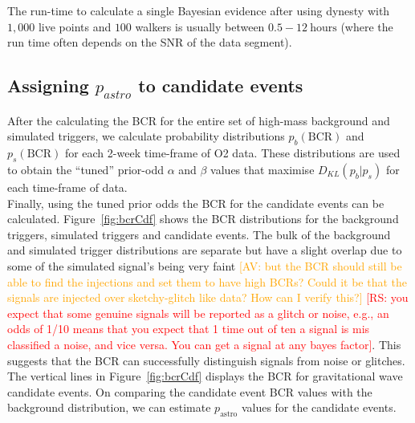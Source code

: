 \documentclass[%
preprint,
 amsmath,amssymb,
 aps,
]{revtex4}
\newcommand{\dynesty}{{\sc dynesty}\xspace}
\newcommand{\bcr}{{\sc BCR}\xspace}
\newcommand{\av}[1]{\textcolor{orange}{[AV: #1]}}
\newcommand{\rs}[1]{\textcolor{red}{[RS: #1]}}
\begin{document}
The run-time to calculate a single Bayesian evidence after using \dynesty with $1,000$ live points and $100$ walkers is usually between $0.5-12\ \text{hours}$ (where the run time often depends on the SNR of the data segment). \\

\subsection{Assigning $p_{astro}$ to candidate events}

After the calculating the \bcr for the entire set of high-mass background and simulated triggers, we calculate probability distributions $p_b(\text{BCR})$ and $p_s(\text{BCR})$ for each 2-week time-frame of O2 data. These distributions are used to obtain the ``tuned'' prior-odd $\alpha$ and $\beta$ values that maximise $D_{KL}(p_b|p_s)$ for each time-frame of data.\\

Finally, using the tuned prior odds the \bcr for the candidate events can be calculated. Figure~\ref{fig:bcrCdf} shows the \bcr distributions for the background triggers, simulated triggers and candidate events. The bulk of the background and simulated trigger distributions are separate but have a slight overlap due to some of the simulated signal's being very faint \av{but the BCR should still be able to find the injections and set them to have high BCRs? Could it be that the signals are injected over sketchy-glitch like data? How can I verify this?} \rs{you expect that some genuine signals will be reported as a glitch or noise, e.g., an odds of 1/10 means that you expect that 1 time out of ten a signal is mis classified a noise, and vice versa. You can get a signal at any bayes factor}. This suggests that the \bcr can successfully distinguish signals from noise or glitches. The vertical lines in Figure~\ref{fig:bcrCdf} displays the \bcr for gravitational wave candidate events. On comparing the candidate event \bcr values with the background distribution, we can estimate $p_\text{astro}$ values for the candidate events. 
\end{document}
